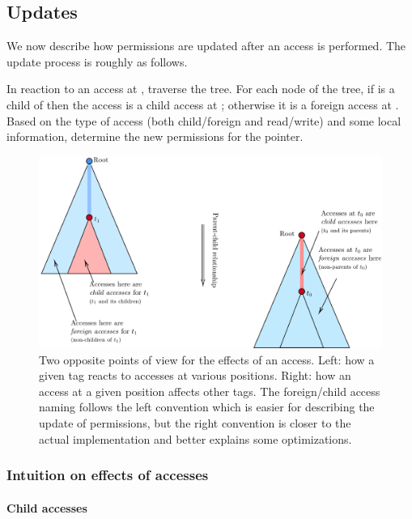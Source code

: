 \documentclass[a4paper,11pt]{article}
\theoremstyle{plain}
\theoremstyle{definition}
\theoremstyle{remark}
\newcommand{\tcode}[1]{\rstinline{#1}}
\begin{document}
\subsection{Updates}
\label{sec:transitions}

We now describe how permissions are updated after an access is performed.
The update process is roughly as follows.

In reaction to an access at \tcode{t0}, traverse the tree. For each \tcode{t1} node of the
tree, if \tcode{t0} is a child of \tcode{t1} then the access is a child access at \tcode{t1}; otherwise
it is a foreign access at \tcode{t1}. Based on the type of access (both child/foreign
and read/write) and some local information, determine the new permissions for the
pointer.

\begin{figure}
    \includegraphics[width=\textwidth]{../figs/child-or-foreign.pdf}
    \caption{Two opposite points of view for the effects of an access.
    Left: how a given tag reacts to accesses at various positions.
    Right: how an access at a given position affects other tags.
    The foreign/child access naming follows the left convention which is easier
    for describing the update of permissions, but the right convention is closer
    to the actual implementation and better explains some optimizations.}
    \label{fig:access-pov}
\end{figure}

\subsubsection{Intuition on effects of accesses}
\label{sec:transitions-basic}

\paragraph*{Child accesses}
\end{document}
